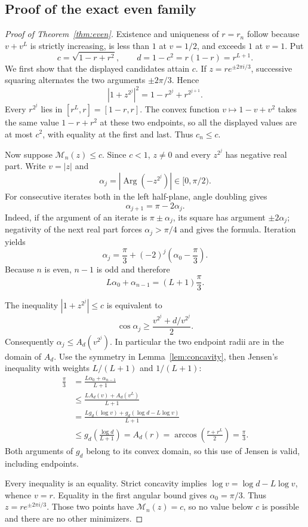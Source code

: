 \documentclass[11pt,a4paper]{article}
\theoremstyle{definition}\newtheorem{definition}[theorem]{Definition}
\theoremstyle{remark}\newtheorem{remark}[theorem]{Remark}
\newcommand{\M}{\mathcal M}
\begin{document}
\subsection{Proof of the exact even family}
\begin{proof}[Proof of Theorem~\ref{thm:even}]
Existence and uniqueness of $r=r_n$ follow because $v+v^L$ is strictly increasing, is less than $1$ at $v=1/2$, and exceeds $1$ at $v=1$. Put
\[
c=\sqrt{1-r+r^2},\qquad d=1-c^2=r(1-r)=r^{L+1}.
\]
We first show that the displayed candidates attain $c$. If $z=r e^{\pm2\pi i/3}$, successive squaring alternates the two arguments $\pm2\pi/3$. Hence
\[
|1+z^{2^j}|^2=1-r^{2^j}+r^{2^{j+1}}.
\]
Every $r^{2^j}$ lies in $[r^L,r]=[1-r,r]$. The convex function $v\mapsto1-v+v^2$ takes the same value $1-r+r^2$ at these two endpoints, so all the displayed values are at most $c^2$, with equality at the first and last. Thus $c_n\le c$.

Now suppose $\M_n(z)\le c$. Since $c<1$, $z\ne0$ and every $z^{2^j}$ has negative real part. Write $v=|z|$ and
\[
\alpha_j=\left|\operatorname{Arg}(-z^{2^j})\right|\in[0,\pi/2).
\]
For consecutive iterates both in the left half-plane, angle doubling gives
\begin{equation}\label{eq:angle-recurrence}
\alpha_{j+1}=\pi-2\alpha_j.
\end{equation}
Indeed, if the argument of an iterate is $\pi\pm\alpha_j$, its square has argument $\pm2\alpha_j$; negativity of the next real part forces $\alpha_j>\pi/4$ and gives the formula. Iteration yields
\[
\alpha_j=\frac\pi3+(-2)^j\left(\alpha_0-\frac\pi3\right).
\]
Because $n$ is even, $n-1$ is odd and therefore
\begin{equation}\label{eq:angle-endpoints}
L\alpha_0+\alpha_{n-1}=(L+1)\frac\pi3.
\end{equation}

The inequality $|1+z^{2^j}|\le c$ is equivalent to
\[
\cos\alpha_j\ge\frac{v^{2^j}+d/v^{2^j}}2.
\]
Consequently $\alpha_j\le A_d(v^{2^j})$. In particular the two endpoint radii are in the domain of $A_d$. Use the symmetry in Lemma~\ref{lem:concavity}, then Jensen's inequality with weights $L/(L+1)$ and $1/(L+1)$:
\begin{align*}
\frac\pi3
&=\frac{L\alpha_0+\alpha_{n-1}}{L+1}\\
&\le\frac{L A_d(v)+A_d(v^L)}{L+1}\\
&=\frac{L g_d(\log v)+g_d(\log d-L\log v)}{L+1}\\
&\le g_d\left(\frac{\log d}{L+1}\right)
=A_d(r)=\arccos\left(\frac{r+r^L}{2}\right)=\frac\pi3.
\end{align*}
Both arguments of $g_d$ belong to its convex domain, so this use of Jensen is valid, including endpoints.

Every inequality is an equality. Strict concavity implies
$\log v=\log d-L\log v$, whence $v=r$. Equality in the first angular bound gives $\alpha_0=\pi/3$. Thus $z=r e^{\pm2\pi i/3}$. Those two points have $\M_n(z)=c$, so no value below $c$ is possible and there are no other minimizers.
\end{proof}
\end{document}
